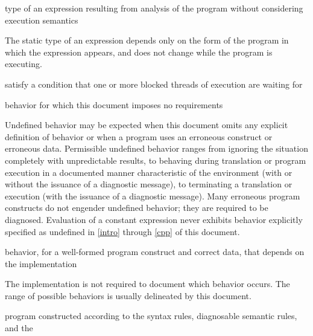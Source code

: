 %
type of an expression resulting from
analysis of the program without considering execution semantics

\begin{defnote}
The static type of an expression depends only on the form of the program in
which the expression appears, and does not change while the program is
executing.
\end{defnote}

%
satisfy a condition that one or more blocked threads of execution are waiting for

%
behavior for which this document
imposes no requirements

\begin{defnote}
Undefined behavior may be expected when
this document omits any explicit
definition of behavior or when a program uses an erroneous construct or erroneous data.
Permissible undefined behavior ranges
from ignoring the situation completely with unpredictable results, to
behaving during translation or program execution in a documented manner
characteristic of the environment (with or without the issuance of a
diagnostic message), to terminating a translation or execution (with the
issuance of a diagnostic message). Many erroneous program constructs do
not engender undefined behavior; they are required to be diagnosed.
Evaluation of a constant expression never exhibits behavior explicitly
specified as undefined in \ref{intro} through \ref{cpp} of this document.
\end{defnote}

%
behavior, for a well-formed program construct and correct data, that
depends on the implementation

\begin{defnote}
The implementation is not required to
document which behavior occurs. The range of
possible behaviors is usually delineated by this document.
\end{defnote}

%
\Cpp{}  program constructed according to the syntax rules, diagnosable
semantic rules, and the %

